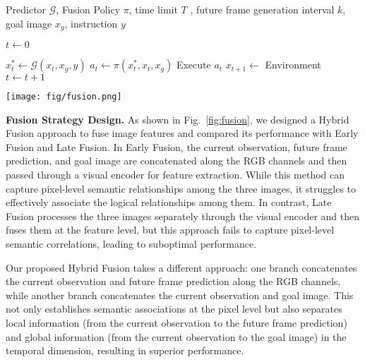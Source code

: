 \begin{algorithm}[ht]
\small
\caption{NavigateDiff: Zero-Shot Navigation Testing}
\label{alg:NavigateDiff}
\begin{algorithmic}[1]
\REQUIRE Predictor $\mathcal{G}$, Fusion Policy $\mathcal{\pi}$, time limit $T$ , future frame generation interval $k$, goal image $x_g$, instruction $y$

\STATE $t \leftarrow 0$

    \STATE $x_t^* \leftarrow \mathcal{G}(x_t,x_g,y)$
        \STATE $a_t \leftarrow \mathcal{\pi}(x_t^*,x_t,x_g)$
        \STATE Execute $a_t$
        \STATE $x_{t+1} \leftarrow $ Environment
        \STATE $t \leftarrow t+1$
    \ENDFOR
\ENDWHILE

\end{algorithmic}
\end{algorithm}

\begin{figure*}[t]
    \centering
    \texttt{[image: fig/fusion.png]}
    \caption{Comparison of different image fusion strategies (a)~Early Fusion, (b)~Late Fusion, and (c)~\textbf{Hybrid Fusion(Ours)}.}
    \label{fig:fusion}
\end{figure*}

\noindent \textbf{Fusion Strategy Design.}
%
As shown in Fig.~\ref{fig:fusion}, we designed a Hybrid Fusion approach to fuse image features and compared its performance with Early Fusion and Late Fusion. 
%
In Early Fusion, the current observation, future frame prediction, and goal image are concatenated along the RGB channels and then passed through a visual encoder for feature extraction. 
%
While this method can capture pixel-level semantic relationships among the three images, it struggles to effectively associate the logical relationships among them. 
%
In contrast, Late Fusion processes the three images separately through the visual encoder and then fuses them at the feature level, but this approach fails to capture pixel-level semantic correlations, leading to suboptimal performance.

Our proposed Hybrid Fusion takes a different approach: one branch concatenates the current observation and future frame prediction along the RGB channels, while another branch concatenates the current observation and goal image. 
%
This not only establishes semantic associations at the pixel level but also separates local information (from the current observation to the future frame prediction) and global information (from the current observation to the goal image) in the temporal dimension, resulting in superior performance. 
